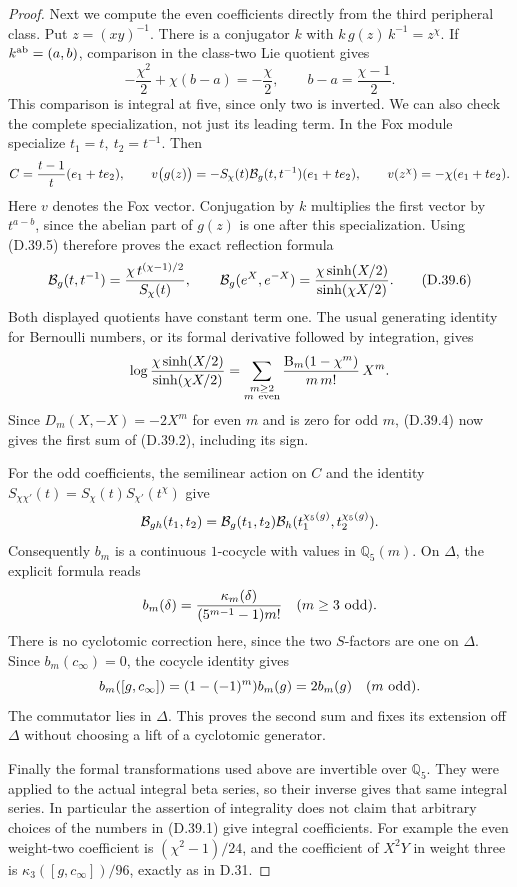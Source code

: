 \begin{proof}
Next we compute the even coefficients directly from the
third peripheral class. Put \(z=(xy)^{-1}\). There is a
conjugator \(k\) with \(k\,g(z)\,k^{-1}=z^\chi\).
If \(k^{\rm ab}=(a,b)\), comparison in the class-two Lie
quotient gives
\[
 -\frac{\chi^2}{2}+\chi(b-a)=-\frac{\chi}{2},
 \qquad b-a=\frac{\chi-1}{2}.                            \tag{D.39.5}
\]
This comparison is integral at five, since only two is
inverted. We can also check the complete specialization,
not just its leading term. In the Fox module specialize
\(t_1=t,\ t_2=t^{-1}\). Then
\[
 C=\frac{t-1}{t}(e_1+t e_2),\qquad
 v\bigl(g(z)\bigr)
   =-S_\chi(t){\cal B}_g(t,t^{-1})(e_1+t e_2),
 \qquad v(z^\chi)=-\chi(e_1+t e_2).
\]
Here \(v\) denotes the Fox vector. Conjugation by \(k\)
multiplies the first vector by \(t^{a-b}\), since the
abelian part of \(g(z)\) is one after this specialization.
Using (D.39.5) therefore proves the exact reflection formula
\[
 {\cal B}_g(t,t^{-1})
       =\frac{\chi\,t^{(\chi-1)/2}}{S_\chi(t)},\qquad
 {\cal B}_g(e^X,e^{-X})
       =\frac{\chi\sinh(X/2)}{\sinh(\chi X/2)}.            \tag{D.39.6}
\]
Both displayed quotients have constant term one.
The usual generating identity for Bernoulli numbers, or
its formal derivative followed by integration, gives
\[
 \log\frac{\chi\sinh(X/2)}{\sinh(\chi X/2)}
 =\sum_{\substack{m\ge2\\m\ {\rm even}}}
       \frac{\mathrm B_m(1-\chi^m)}{m\,m!}\,X^m.
\]
Since \(D_m(X,-X)=-2X^m\) for even \(m\) and is zero
for odd \(m\), (D.39.4) now gives the first sum of
(D.39.2), including its sign.

For the odd coefficients, the semilinear action on \(C\)
and the identity
\(S_{\chi\chi'}(t)=S_\chi(t)S_{\chi'}(t^\chi)\)
give
\[
 {\cal B}_{gh}(t_1,t_2)
  ={\cal B}_g(t_1,t_2)
       {\cal B}_h(t_1^{\chi_5(g)},t_2^{\chi_5(g)}).
\]
Consequently \(b_m\) is a continuous \(1\)-cocycle with
values in \(\mathbb Q_5(m)\). On \(\Delta\), the explicit
formula \cite[(1.1)--(1.2)]{DE_NakamuraSakugawaWojtkowiak2017}
reads
\[
 b_m(\delta)=\frac{\kappa_m(\delta)}
                   {(5^{m-1}-1)m!}
 \quad(m\ge3\ {\rm odd}).
\]
There is no cyclotomic correction here, since the two
\(S\)-factors are one on \(\Delta\). Since
\(b_m(c_\infty)=0\), the cocycle identity gives
\[
 b_m([g,c_\infty])
       =(1-(-1)^m)b_m(g)=2b_m(g)
                  \quad(m\ {\rm odd}).
\]
The commutator lies in \(\Delta\). This proves the
second sum and fixes its extension off \(\Delta\)
without choosing a lift of a cyclotomic generator.

Finally the formal transformations used above are
invertible over \(\mathbb Q_5\). They were applied to
the actual integral beta series, so their inverse gives
that same integral series. In particular the assertion
of integrality does not claim that arbitrary choices
of the numbers in (D.39.1) give integral coefficients.
For example the even weight-two coefficient is
\((\chi^2-1)/24\), and the coefficient of \(X^2Y\)
in weight three is
\(\kappa_3([g,c_\infty])/96\), exactly as in D.31.
\end{proof}

